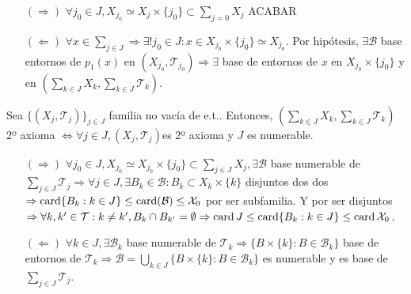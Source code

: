 \begin{dem}
  \begin{enumerate}[label=(\roman*)]
    \item []
    \item [$(\Rightarrow)$] $\forall j_{0} \in J, X_{j_{0}} \simeq X_{j} \times \{ j_{0} \} \subset \sum_{j = 0}^{} X_{j}$ ACABAR
    \item [$(\Leftarrow)$] $\forall x \in \sum_{j \in J} \Rightarrow \exists ! j_{0} \in J :  x \in X_{j_{0}} \times \{  j_{0} \} \simeq X_{j_{0}}$. Por hipótesis, $\exists \mathcal{B}$ base entornos de $p_{1}(x)$ en $( X_{j_{0}}, \mathcal{T}_{j_{0}} ) \Rightarrow \exists$ base de entornos de $x$ en $X_{j_{0}} \times \{ j_{0} \}$ y en $( \sum_{k \in J} X_{k}, \sum_{k \in J} \mathcal{T}_{k})$.
  \end{enumerate}
\end{dem}

\begin{prop}
  Sea $\{ ( X_{j}, \mathcal{T}_{j} ) \}_{j \in J}$ familia no vacía de e.t.. Entonces, $( \sum_{k \in J} X_{k}, \sum_{k \in J} \mathcal{T}_{k})$ 2º axioma $\Leftrightarrow \forall j \in J, ( X_{j}, \mathcal{T}_{j} )$es 2º axioma y $J$ es numerable.
\end{prop}

\begin{dem}
  \begin{enumerate}[label=(\roman*)]
    \item []
    \item [$(\Rightarrow)$] $\forall j_{0} \in J, X_{j_{0}} \simeq X_{j_{0}} \times \{ j_{0} \} \subset \sum_{j \in J} X_{j}, \exists \mathcal{B}$ base numerable de $\sum_{j \in J} \mathcal{T}_{j} \Rightarrow \forall j \in J, \exists B_{k} \in \mathcal{B} : B_{k} \subset X_{k} \times \{ k \}$ disjuntos dos dos $\Rightarrow \operatorname{card} \{ B_{k} : k \in J \} \leq \operatorname{card}(\mathcal{B}) \leq \mathcal{X}_{0}$ por ser subfamilia. Y por ser disjuntos $\Rightarrow \forall k, k' \in \mathcal{T} : k \neq k', B_{k} \cap B_{k'} = \emptyset \Rightarrow \operatorname{card} J \leq \operatorname{card} \{  B_{k} : k \in J \} \leq \operatorname{card} \mathcal{X}_{0}$.
    \item [$(\Leftarrow)$] $\forall k \in J, \exists \mathcal{B}_{k}$ base numerable de $\mathcal{T}_{k} \Rightarrow \{  B \times \{ k \} : B \in \mathcal{B}_{k} \}$ base de entornos de $\mathcal{T}_{k} \Rightarrow \mathcal{B} = \bigcup_{k \in J} \{ B \times \{ k \}: B \in \mathcal{B}_{k} \}$ es numerable y es base de $\sum_{j \in J} \mathcal{T}_{j}$.
  \end{enumerate}
\end{dem}


